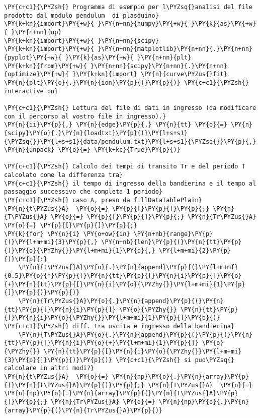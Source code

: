 \begin{Verbatim}[label=\makebox{\href{https://github.com/unipi-physics-labs/lab1-sheets/tree/main/snippy/plasduino_pendulum_testT.py}{https://github.com/.../plasduino\_pendulum\_testT.py}},commandchars=\\\{\}]
\PY{c+c1}{\PYZsh{} Programma di esempio per l\PYZsq{}analisi del file prodotto dal modulo pendulum  di plasduino}
\PY{k+kn}{import}\PY{+w}{ }\PY{n+nn}{numpy}\PY{+w}{ }\PY{k}{as}\PY{+w}{ }\PY{n+nn}{np}
\PY{k+kn}{import}\PY{+w}{ }\PY{n+nn}{scipy}
\PY{k+kn}{import}\PY{+w}{ }\PY{n+nn}{matplotlib}\PY{n+nn}{.}\PY{n+nn}{pyplot}\PY{+w}{ }\PY{k}{as}\PY{+w}{ }\PY{n+nn}{plt}
\PY{k+kn}{from}\PY{+w}{ }\PY{n+nn}{scipy}\PY{n+nn}{.}\PY{n+nn}{optimize}\PY{+w}{ }\PY{k+kn}{import} \PY{n}{curve\PYZus{}fit}
\PY{n}{plt}\PY{o}{.}\PY{n}{ion}\PY{p}{(}\PY{p}{)} \PY{c+c1}{\PYZsh{} interactive on}

\PY{c+c1}{\PYZsh{} Lettura del file di dati in ingresso (da modificare con il percorso al vostro file in ingresso).}
\PY{n}{ii}\PY{p}{,} \PY{n}{edge}\PY{p}{,} \PY{n}{tt} \PY{o}{=} \PY{n}{scipy}\PY{o}{.}\PY{n}{loadtxt}\PY{p}{(}\PY{l+s+s1}{\PYZsq{}}\PY{l+s+s1}{data/pendulum.txt}\PY{l+s+s1}{\PYZsq{}}\PY{p}{,} \PY{n}{unpack} \PY{o}{=} \PY{k+kc}{True}\PY{p}{)}

\PY{c+c1}{\PYZsh{} Calcolo dei tempi di transito Tr e del periodo T calcolato come la differenza tra}
\PY{c+c1}{\PYZsh{} il tempo di ingresso della bandierina e il tempo al passaggio successivo che completa 1 periodo}
\PY{c+c1}{\PYZsh{} caso A, preso da fillDataTablePlain}
\PY{n}{t\PYZus{}A}  \PY{o}{=} \PY{p}{[}\PY{p}{]}\PY{p}{;} \PY{n}{T\PYZus{}A} \PY{o}{=} \PY{p}{[}\PY{p}{]}\PY{p}{;} \PY{n}{Tr\PYZus{}A} \PY{o}{=} \PY{p}{[}\PY{p}{]}\PY{p}{;}
\PY{k}{for} \PY{n}{i} \PY{o+ow}{in} \PY{n+nb}{range}\PY{p}{(}\PY{l+m+mi}{3}\PY{p}{,} \PY{n+nb}{len}\PY{p}{(}\PY{n}{tt}\PY{p}{)}\PY{o}{\PYZhy{}}\PY{l+m+mi}{1}\PY{p}{,} \PY{l+m+mi}{2}\PY{p}{)}\PY{p}{:}
    \PY{n}{t\PYZus{}A}\PY{o}{.}\PY{n}{append}\PY{p}{(}\PY{l+m+mf}{0.5}\PY{o}{*}\PY{p}{(}\PY{n}{tt}\PY{p}{[}\PY{n}{i}\PY{p}{]}\PY{o}{+}\PY{n}{tt}\PY{p}{[}\PY{n}{i}\PY{o}{\PYZhy{}}\PY{l+m+mi}{1}\PY{p}{]}\PY{p}{)}\PY{p}{)}
    \PY{n}{Tr\PYZus{}A}\PY{o}{.}\PY{n}{append}\PY{p}{(}\PY{n}{tt}\PY{p}{[}\PY{n}{i}\PY{p}{]} \PY{o}{\PYZhy{}} \PY{n}{tt}\PY{p}{[}\PY{n}{i}\PY{o}{\PYZhy{}}\PY{l+m+mi}{1}\PY{p}{]}\PY{p}{)}    \PY{c+c1}{\PYZsh{} diff. tra uscita e ingresso della bandierina}
    \PY{n}{T\PYZus{}A}\PY{o}{.}\PY{n}{append}\PY{p}{(}\PY{p}{(}\PY{n}{tt}\PY{p}{[}\PY{n}{i}\PY{o}{+}\PY{l+m+mi}{1}\PY{p}{]} \PY{o}{\PYZhy{}} \PY{n}{tt}\PY{p}{[}\PY{n}{i}\PY{o}{\PYZhy{}}\PY{l+m+mi}{3}\PY{p}{]}\PY{p}{)}\PY{p}{)} \PY{c+c1}{\PYZsh{} si puo\PYZsq{} calcolare in altri modi?}
\PY{n}{t\PYZus{}A}  \PY{o}{=} \PY{n}{np}\PY{o}{.}\PY{n}{array}\PY{p}{(}\PY{n}{t\PYZus{}A}\PY{p}{)}\PY{p}{;} \PY{n}{T\PYZus{}A}  \PY{o}{=} \PY{n}{np}\PY{o}{.}\PY{n}{array}\PY{p}{(}\PY{n}{T\PYZus{}A}\PY{p}{)}\PY{p}{;} \PY{n}{Tr\PYZus{}A} \PY{o}{=} \PY{n}{np}\PY{o}{.}\PY{n}{array}\PY{p}{(}\PY{n}{Tr\PYZus{}A}\PY{p}{)}


\end{Verbatim}
